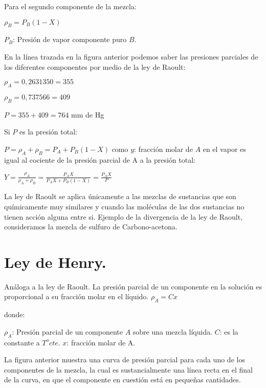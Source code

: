 \documentclass[11pt,openany]{book}
\begin{document}
\newline\newline

  Para el segundo componente de la mezcla:

  $\rho_B=P_B (1-X)$

  $P_B$: Presión de vapor componente puro $B$.

En la línea trazada en la figura anterior podemos saber las presiones parciales de los diferentes
 componentes por medio de la ley de Raoult:

$\rho_A=0,263 1350 = 355$

$\rho_B= 0,737 566 = 409$

$P = 355 + 409 = 764$ mm de Hg

Si $P$ es la presión total:

$P=\rho_A + \rho_B = P_A + P_B (1-X)$ como 
$y$: fracción molar de $A$ en el vapor es igual al cociente de la presión parcial de A a la presión total:

$Y=\frac{\rho_A}{\rho_A+\rho_B}=\frac{P_A X}{P_A X+P_B (1-X)}=\frac{P_A X}{P}$

La ley de Raoult se aplica únicamente a las mezclas de sustancias que son químicamente muy similares 
y cuando las moléculas de las dos sustancias no tienen acción alguna entre si. Ejemplo de la 
divergencia de la ley de Raoult, consideramos la mezcla de sulfuro de Carbono-acetona.

\section{Ley de Henry.}

Análoga a la ley de Raoult. La presión parcial de un componente en la solución es proporcional a su 
fracción molar en el líquido.
$\rho_A = C x$

donde:

$\rho_A$: Presión parcial de un componente $A$ sobre una mezcla líquida.
$C$: es la constante a $T^o cte.$
$x$: fracción molar de A.

La figura anterior muestra una curva de presión parcial para cada uno de los componentes de la 
mezcla, la cual es sustancialmente una línea recta en el final de la curva, en que el componente en 
cuestión está en pequeñas cantidades.
\end{document}
